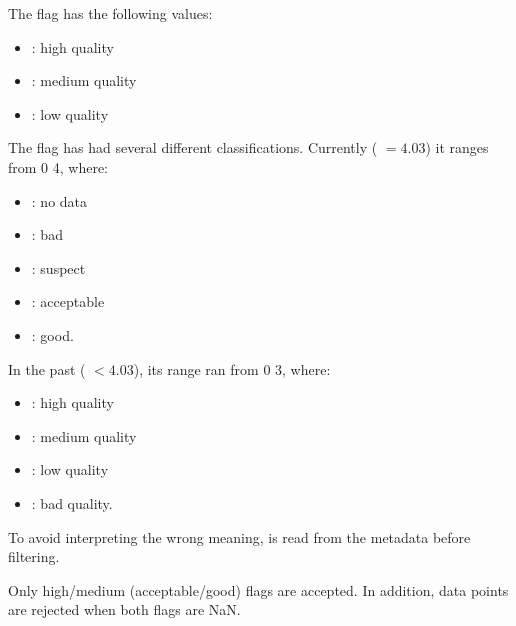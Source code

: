 \documentclass[a4paper,10pt,english]{sphinxmanual}
\begin{document}
\sphinxAtStartPar
The  flag has the following values:
\begin{itemize}
\item {} 
: high quality

\item {} 
: medium quality

\item {} 
: low quality

\end{itemize}

\sphinxAtStartPar
The  flag has had several different classifications. Currently ( \(= 4.03\)) it ranges from 0 \textendash{} 4, where:
\begin{itemize}
\item {} 
: no data

\item {} 
: bad

\item {} 
: suspect

\item {} 
: acceptable

\item {} 
: good.

\end{itemize}

\sphinxAtStartPar
In the past ( \(<4.03\)), its range ran from 0 \textendash{} 3, where:
\begin{itemize}
\item {} 
: high quality

\item {} 
: medium quality

\item {} 
: low quality

\item {} 
: bad quality.

\end{itemize}

\sphinxAtStartPar
To avoid interpreting the wrong meaning,  is read from the metadata before filtering.

\sphinxAtStartPar
Only high/medium (acceptable/good) flags are accepted. In addition, data points are rejected when both flags are NaN.
\end{document}
